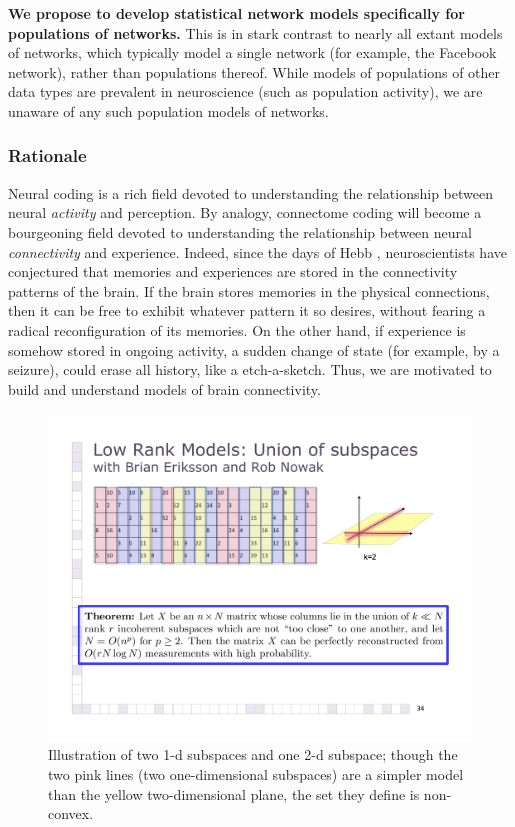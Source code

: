 \documentclass[times,11pt]{article} %
\begin{document}
% 
\textbf{We propose to develop statistical network models specifically for populations of networks. }  This is in stark contrast to nearly all extant models of networks, which typically model a single network (for example, the Facebook network), rather than populations thereof.  While models of populations of other data types are prevalent in neuroscience (such as population activity), we are unaware of any such population models of networks.



\subsubsection*{Rationale}

Neural coding is a rich field devoted to understanding the relationship between neural \emph{activity} and perception.  By analogy, connectome coding will become a bourgeoning field devoted to understanding the relationship between neural \emph{connectivity} and experience.  Indeed, since the days of Hebb \cite{??}, neuroscientists have conjectured that memories and experiences are stored in the connectivity patterns of the brain.  If the brain stores memories in the physical connections, then it can be free to exhibit whatever pattern it so desires, without fearing a radical reconfiguration of its memories.  On the other hand, if experience is somehow stored in ongoing activity, a sudden change of state (for example, by a seizure), could erase all history, like a etch-a-sketch.   Thus, we are motivated to build and understand models of brain connectivity. 



\begin{figure}
\centering
\includegraphics[width=.4\textwidth]{figs/unionspic}
\caption{\small Illustration of two 1-d subspaces and one 2-d subspace; though the two pink lines (two one-dimensional subspaces) are a simpler model than the yellow two-dimensional plane, the set they define is non-convex.}
\label{fig:unionsum}
\end{figure}
\end{document}
